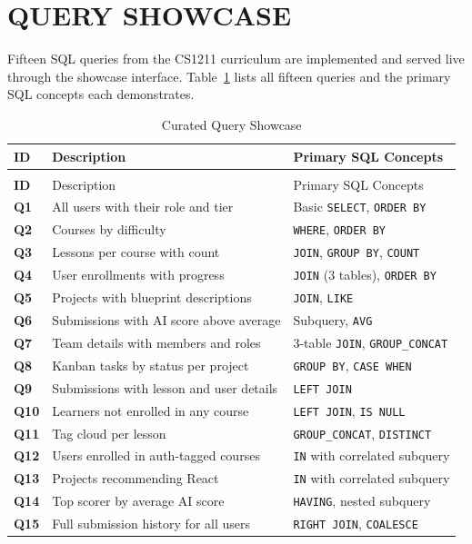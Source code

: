 \documentclass[12pt,a4paper]{article}
\begin{document}
\section{QUERY SHOWCASE}

Fifteen SQL queries from the CS1211 curriculum are implemented and served live through the
showcase interface. Table~\ref{tab:queries} lists all fifteen queries and the primary SQL
concepts each demonstrates.

\begin{longtable}{>{\bfseries}p{1cm} p{5cm} p{7.5cm}}
\caption{Curated Query Showcase}
\label{tab:queries} \\
\toprule
ID & Description & Primary SQL Concepts \\
\midrule
\endfirsthead
\multicolumn{3}{c}{\tablename\ \thetable{} -- continued} \\
\toprule
ID & Description & Primary SQL Concepts \\
\midrule
\endhead
\bottomrule
\endlastfoot
Q1 & All users with their role and tier & Basic \texttt{SELECT}, \texttt{ORDER BY} \\[3pt]
Q2 & Courses by difficulty & \texttt{WHERE}, \texttt{ORDER BY} \\[3pt]
Q3 & Lessons per course with count & \texttt{JOIN}, \texttt{GROUP BY}, \texttt{COUNT} \\[3pt]
Q4 & User enrollments with progress & \texttt{JOIN} (3 tables), \texttt{ORDER BY} \\[3pt]
Q5 & Projects with blueprint descriptions & \texttt{JOIN}, \texttt{LIKE} \\[3pt]
Q6 & Submissions with AI score above average & Subquery, \texttt{AVG} \\[3pt]
Q7 & Team details with members and roles & 3-table \texttt{JOIN}, \texttt{GROUP\_CONCAT} \\[3pt]
Q8 & Kanban tasks by status per project & \texttt{GROUP BY}, \texttt{CASE WHEN} \\[3pt]
Q9 & Submissions with lesson and user details & \texttt{LEFT JOIN} \\[3pt]
Q10 & Learners not enrolled in any course & \texttt{LEFT JOIN}, \texttt{IS NULL} \\[3pt]
Q11 & Tag cloud per lesson & \texttt{GROUP\_CONCAT}, \texttt{DISTINCT} \\[3pt]
Q12 & Users enrolled in auth-tagged courses & \texttt{IN} with correlated subquery \\[3pt]
Q13 & Projects recommending React & \texttt{IN} with correlated subquery \\[3pt]
Q14 & Top scorer by average AI score & \texttt{HAVING}, nested subquery \\[3pt]
Q15 & Full submission history for all users & \texttt{RIGHT JOIN}, \texttt{COALESCE} \\[3pt]
\end{longtable}
\end{document}
